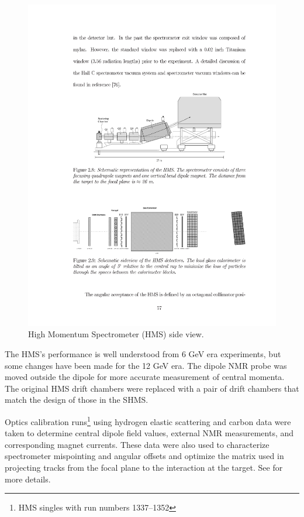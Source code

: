 \begin{figure}[!h]
    \centering
    \includegraphics[width=1.0\textwidth]{chap3/hms_schematic.pdf}
    \caption{High Momentum Spectrometer (HMS) side view.}
    \label{fig:hms_schematic}
\end{figure}

The HMS's performance is well understood from 6 GeV era experiments, but
some changes have been made for the 12 GeV era.
The dipole NMR probe was moved outside the dipole for more accurate measurement
of central momenta.
The original HMS drift chambers were replaced with a pair of drift chambers
that match the design of those in the SHMS.

Optics calibration runs\footnote{HMS singles with run numbers 1337–1352}
using hydrogen elastic scattering and carbon data were taken to determine
central dipole field values, external NMR measurements, and corresponding
magnet currents.
These data were also used to characterize spectrometer mispointing and angular
offsets and optimize the matrix used in projecting tracks from the focal
plane to the interaction at the target.
See \cite{Holly_HMS_Optics} for more details.

